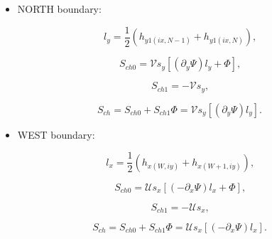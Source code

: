 \documentclass[11pt]{article}
\begin{document}
\bigskip

\begin{itemize}
\item  NORTH boundary:
\end{itemize}

\bigskip

\begin{equation}
l_{y}=\frac{1}{2}\left( h_{y1\left( ix,N-1\right) }+h_{y1\left( ix,N\right)
}\right) \text{,}   \label{c305a}
\end{equation}

\begin{equation}
S_{ch0}=\mathcal{V}s_{y}\left[ \left( \partial_{y}\Psi\right) l_{y}+\Phi%
\right] \text{,}   \label{c305}
\end{equation}

\begin{equation}
S_{ch1}=-\mathcal{V}s_{y}\text{,}   \label{c306}
\end{equation}

\begin{equation}
S_{ch}=S_{ch0}+S_{ch1}\Phi=\mathcal{V}s_{y}\left[ \left(
\partial_{y}\Psi\right) l_{y}\right] \text{.}   \label{c307}
\end{equation}

\bigskip

\begin{itemize}
\item  WEST boundary:
\end{itemize}

\bigskip

\begin{equation}
l_{x}=\frac{1}{2}\left( h_{x\left( W,iy\right) }+h_{x\left( W+1,iy\right)
}\right) \text{,}   \label{c308a}
\end{equation}

\begin{equation}
S_{ch0}=\mathcal{U}s_{x}\left[ \left( -\partial_{x}\Psi\right) l_{x}+\Phi%
\right] \text{,}   \label{c308}
\end{equation}

\begin{equation}
S_{ch1}=-\mathcal{U}s_{x}\text{,}   \label{c309}
\end{equation}

\begin{equation}
S_{ch}=S_{ch0}+S_{ch1}\Phi=\mathcal{U}s_{x}\left[ \left(
-\partial_{x}\Psi\right) l_{x}\right] \text{.}   \label{c310}
\end{equation}
\end{document}

